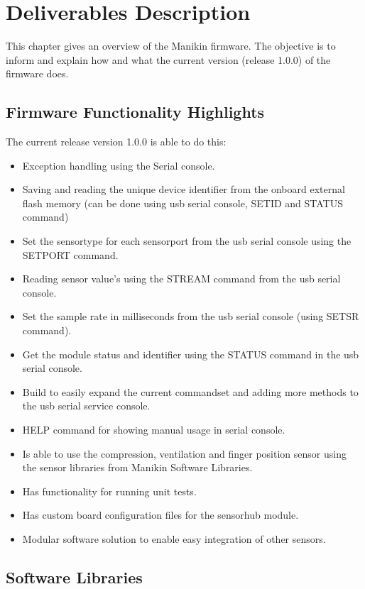 \chapter{Deliverables Description}
This chapter gives an overview of the Manikin firmware. The objective is to inform and explain how and what the current version (release 1.0.0) of the firmware does.
\section{Firmware Functionality Highlights}
The current release version 1.0.0 is able to do this:
\begin{itemize}
  \item Exception handling using the Serial console.
  \item Saving and reading the unique device identifier from the onboard external flash memory (can be done using usb serial console, SETID and STATUS command)
  \item Set the sensortype for each sensorport from the usb serial console using the SETPORT command.
  \item Reading sensor value's using the STREAM command from the usb serial console.
  \item Set the sample rate in milliseconds from the usb serial console (using SETSR command).
  \item Get the module status and identifier using the STATUS command in the usb serial console.
  \item Build to easily expand the current commandset and adding more methods to the usb serial service console.
  \item HELP command for showing manual usage in serial console.
  \item Is able to use the compression, ventilation and finger position sensor using the sensor libraries from Manikin Software Libraries.
  \item Has functionality for running unit tests.
  \item Has custom board configuration files for the sensorhub module.
  \item Modular software solution to enable easy integration of other sensors.
\end{itemize}

\section{Software Libraries}

